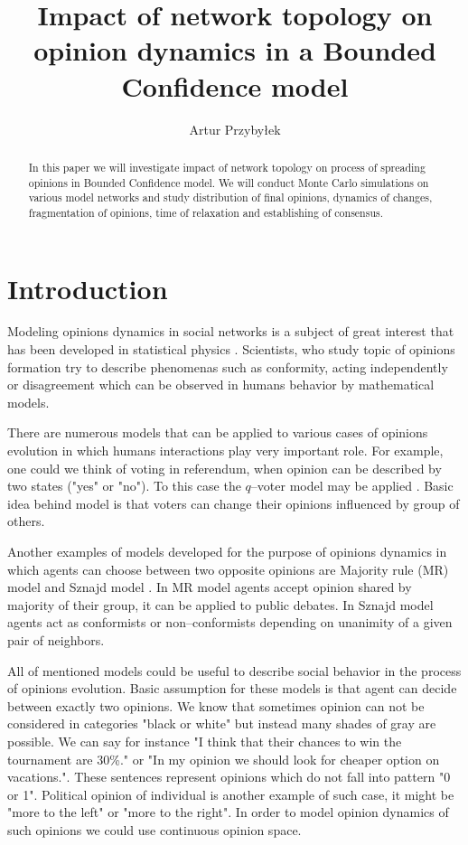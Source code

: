\documentclass{article}
\title{Impact of network topology on opinion dynamics in a Bounded Confidence model}
\author{Artur Przybyłek}
\begin{document}
\begin{titlepage}
	\maketitle
	\begin{abstract}
	In this paper we will investigate impact of network topology on process of spreading opinions in Bounded Confidence model. We will conduct Monte Carlo simulations on various model networks and study distribution of final opinions, dynamics of changes, fragmentation of opinions, time of relaxation and establishing of consensus.
	\end{abstract}
\end{titlepage}


\tableofcontents

\newpage

\section{Introduction}

Modeling opinions dynamics in social networks is a subject of great interest that has been developed in statistical physics \cite{sp}. Scientists, who study topic of opinions formation try to describe phenomenas such as conformity, acting independently or disagreement which can be observed in humans behavior by mathematical models. 
\indent

There are numerous models that can be applied to various cases of opinions evolution in which humans interactions play very important role. For example, one could we think of voting in referendum, when opinion can be described by two states ("yes" or "no"). To this case the $q$--voter model may be applied \cite{qv}. Basic idea behind model is that voters can change their opinions influenced by group of others. 
\indent

Another examples of models developed for the purpose of opinions dynamics in which agents can choose between two opposite opinions are Majority rule (MR) model \cite{mr} and Sznajd model \cite{sm}. In MR model agents accept opinion shared by majority of their group, it can be applied to public debates. In Sznajd model agents act as conformists or non--conformists depending on unanimity of a given pair of neighbors.
\indent

All of mentioned models could be useful to describe social behavior in the process of opinions evolution. Basic assumption for these models is that agent can decide between exactly two opinions. We know that sometimes opinion can not be considered in categories "black or white" but instead many shades of gray are possible. We can say for instance "I think that their chances to win the tournament are 30\%." or "In my opinion we should look for cheaper option on vacations.". These sentences represent opinions which do not fall into pattern "0 or 1". Political opinion of individual is another example of such case, it might be "more to the left" or "more to the right". In order to model opinion dynamics of such opinions we could use continuous opinion space.
\indent
\end{document}
